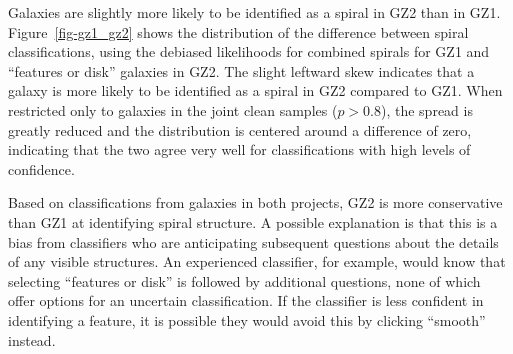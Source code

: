 \documentclass[useAMS,usenatbib]{mn2e}
\begin{document}
Galaxies are slightly more likely to be identified as a spiral in GZ2 than in GZ1. Figure~\ref{fig-gz1_gz2} shows the distribution of the difference between spiral classifications, using the debiased likelihoods for combined spirals for GZ1 and ``features or disk'' galaxies in GZ2. The slight leftward skew indicates that a galaxy is more likely to be identified as a spiral in GZ2 compared to GZ1. When restricted only to galaxies in the joint clean samples ($p>0.8$), the spread is greatly reduced and the distribution is centered around a difference of zero, indicating that the two agree very well for classifications with high levels of confidence. 

Based on classifications from galaxies in both projects, GZ2 is more conservative than GZ1 at identifying spiral structure. A possible explanation is that this is a bias from classifiers who are anticipating subsequent questions about the details of any visible structures. An experienced classifier, for example, would know that selecting ``features or disk'' is followed by additional questions, none of which offer options for an uncertain classification. If the classifier is less confident in identifying a feature, it is possible they would avoid this by clicking ``smooth'' instead. %


\end{document}
